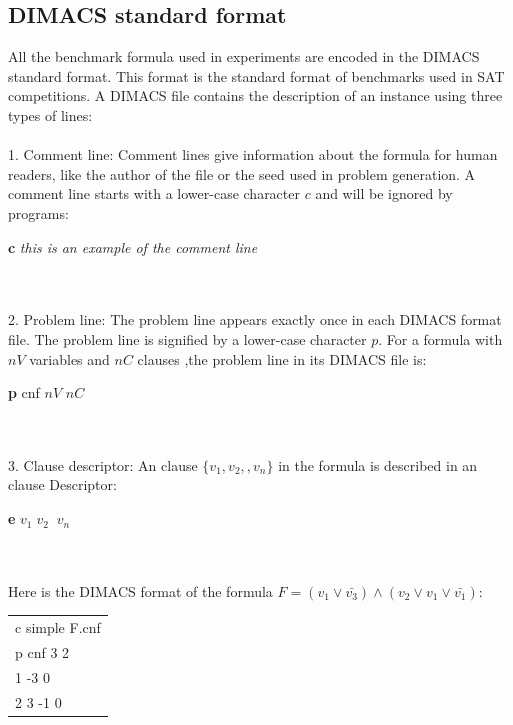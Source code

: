 \documentclass[12pt,a4paper,twoside]{scrartcl}
\numberwithin{equation}{section}
\begin{document}
\subsection{DIMACS standard format}  
All the benchmark formula used in experiments are encoded in the DIMACS standard format\cite{balyo2017proceedings}. This format is the standard format of benchmarks used in SAT competitions. A DIMACS file contains the description of an instance using three types of lines:\\
\\ 1. Comment line: Comment lines give information about the formula for human readers, like the author of the file or the seed used in problem generation. A comment line starts with a lower-case character $c$ and will be ignored by programs:\\ \centerline{\textbf{c} \emph{ this is an example of the comment line }}\\ \\ 2. Problem line: The problem line appears exactly once in each DIMACS format file. The problem line is signified by a lower-case character $p$.  For a formula with $nV$ variables and $nC$ clauses ,the problem line in its DIMACS file is:\\ \centerline{\textbf{p} cnf $nV$ $nC$}\\ \\ 3. Clause descriptor: An clause $\{v_1, v_2,, v_n\}$ in the formula is described in an clause Descriptor:\\ \centerline{\textbf{e} $v_1\; v_2\;  \;v_n$}\\  
\\
Here is the DIMACS format of the formula $F = (v_1 \lor \bar{v_3}) \land (v_2 \lor v_1 \lor \bar{v_1})$:
\begin{center}
\begin{tabular}{l}
c simple F.cnf\\
p cnf 3 2\\
1 -3 0\\
2 3 -1 0 \\
\end{tabular}
\end{center}
\end{document}
